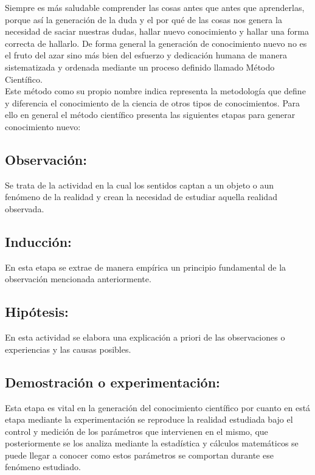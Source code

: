 Siempre es más saludable comprender las cosas antes que antes que aprenderlas, porque así la generación de la duda y el por qué 
de 
las cosas nos genera la necesidad de saciar nuestras dudas, hallar nuevo conocimiento y hallar una forma correcta de hallarlo. De 
forma general la generación de 
conocimiento nuevo no es el fruto del azar sino más bien del esfuerzo y dedicación humana de manera sistematizada y ordenada 
mediante un proceso definido llamado Método Científico.\\

Este método como su propio nombre indica representa la metodología que define y diferencia el conocimiento de la ciencia de otros 
tipos de conocimientos. Para ello en general el método científico presenta las siguientes etapas para generar conocimiento nuevo:

\subsection{Observación:}
Se trata de la actividad en la cual los sentidos captan a un objeto o aun fenómeno de la realidad y crean la necesidad de 
estudiar 
aquella realidad observada.

\subsection{Inducción:}

En esta etapa se extrae de manera empírica un principio fundamental de la observación mencionada anteriormente.

\subsection{Hipótesis:}

En esta actividad se elabora una explicación a priori de las observaciones o experiencias y las causas posibles.

\subsection{Demostración o experimentación:}

Esta etapa es vital en la generación del conocimiento científico por cuanto en está etapa mediante la experimentación se 
reproduce 
la realidad estudiada bajo el control y medición de los parámetros que intervienen en el mismo, que posteriormente se los analiza 
mediante la estadística y cálculos 
matemáticos se puede llegar a conocer como estos parámetros se comportan durante ese fenómeno estudiado.

